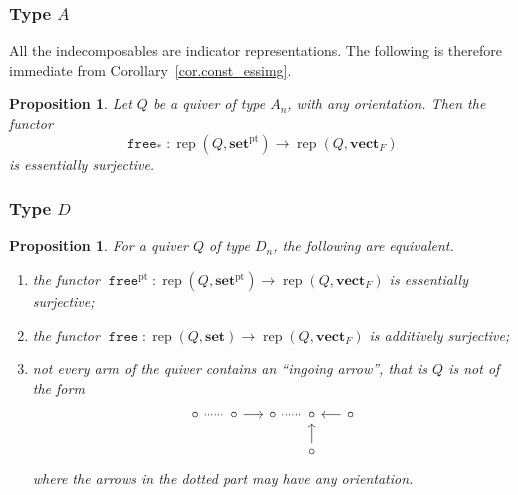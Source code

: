 \documentclass[a4paper]{amsart}
\theoremstyle{plain}
\newtheorem{proposition}[theorem]{Proposition}
\theoremstyle{definition}
\theoremstyle{remark}
\newcommand{\funct}[1]{\operatorname{\mathtt{#1}}}
\newcommand{\set}{\mathbf{set}}
\newcommand{\pset}{\mathbf{set}^\mathrm{pt}}
\newcommand{\vectF}{\mathbf{vect}_F}
\DeclareMathOperator{\rep}{rep}
\begin{document}
\subsubsection{Type $A$}

All the indecomposables are indicator representations. The following is therefore immediate from Corollary~\ref{cor.const_essimg}.

\begin{proposition}
\label{prop.An}
Let \( Q \) be a quiver of type \( A_n \), with any orientation. Then the functor
\[ \funct{free}_* \colon \rep( Q, \pset) \to \rep( Q, \vectF) \]
is essentially surjective.
\end{proposition}

\subsubsection{Type $D$}

\begin{proposition} \label{prop:when_is_Dn_realizable}
For a quiver \( Q \) of type \( D_n \), the following are equivalent.
\begin{enumerate}
\item the functor \( \funct{free}^\mathrm{pt} \colon \rep( Q, \pset) \to \rep( Q, \vectF) \)
is essentially surjective;
\item the functor \( \funct{free} \colon \rep( Q, \set) \to \rep( Q, \vectF) \)
is additively surjective;
\item not every arm of the quiver contains an ``ingoing arrow'', that is \( Q \) is not of the form
\[ \begin{tikzcd}[sep=5mm]
\circ \ar[r,-,dotted,very thick] & \circ \ar[r] & \circ \ar[r,-,dotted,very thick] & \circ & \circ \ar[l] \\
&&& \circ \ar[u] 
\end{tikzcd} \]
where the arrows in the dotted part may have any orientation.
\end{enumerate}
\end{proposition}
\end{document}
